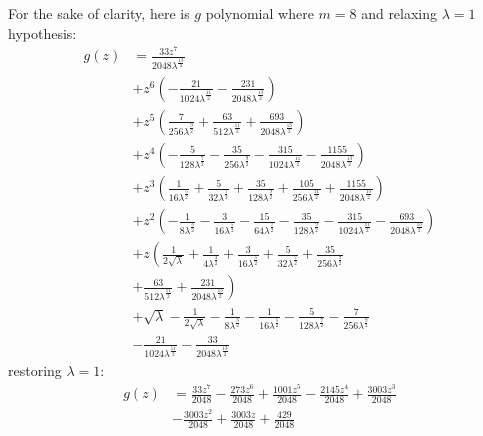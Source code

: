 For the sake of clarity, here is $g$ polynomial where $m=8$ and relaxing $\lambda=1$ hypothesis:
\begin{displaymath}
\begin{split}
g{\left (z \right )} &= \frac{33 z^{7}}{2048 \lambda^{\frac{13}{2}}} \\
&+ z^{6} \left(- \frac{21}{1024 \lambda^{\frac{11}{2}}} - \frac{231}{2048 \lambda^{\frac{13}{2}}}\right) \\
&+ z^{5} \left(\frac{7}{256 \lambda^{\frac{9}{2}}} + \frac{63}{512 \lambda^{\frac{11}{2}}} + \frac{693}{2048 \lambda^{\frac{13}{2}}}\right) \\
&+ z^{4} \left(- \frac{5}{128 \lambda^{\frac{7}{2}}} - \frac{35}{256 \lambda^{\frac{9}{2}}} - \frac{315}{1024 \lambda^{\frac{11}{2}}} - \frac{1155}{2048 \lambda^{\frac{13}{2}}}\right) \\
&+ z^{3} \left(\frac{1}{16 \lambda^{\frac{5}{2}}} + \frac{5}{32 \lambda^{\frac{7}{2}}} + \frac{35}{128 \lambda^{\frac{9}{2}}} + \frac{105}{256 \lambda^{\frac{11}{2}}} + \frac{1155}{2048 \lambda^{\frac{13}{2}}}\right) \\
&+ z^{2} \left(- \frac{1}{8 \lambda^{\frac{3}{2}}} - \frac{3}{16 \lambda^{\frac{5}{2}}} - \frac{15}{64 \lambda^{\frac{7}{2}}} - \frac{35}{128 \lambda^{\frac{9}{2}}} - \frac{315}{1024 \lambda^{\frac{11}{2}}} - \frac{693}{2048 \lambda^{\frac{13}{2}}}\right) \\
&+ z \left(\frac{1}{2 \sqrt{\lambda}} + \frac{1}{4 \lambda^{\frac{3}{2}}} + \frac{3}{16 \lambda^{\frac{5}{2}}} + \frac{5}{32 \lambda^{\frac{7}{2}}} + \frac{35}{256 \lambda^{\frac{9}{2}}} \right. \\
    &+ \left. \frac{63}{512 \lambda^{\frac{11}{2}}} + \frac{231}{2048 \lambda^{\frac{13}{2}}}\right) \\
&+ \sqrt{\lambda} - \frac{1}{2 \sqrt{\lambda}} - \frac{1}{8 \lambda^{\frac{3}{2}}} - \frac{1}{16 \lambda^{\frac{5}{2}}} - \frac{5}{128 \lambda^{\frac{7}{2}}} - \frac{7}{256 \lambda^{\frac{9}{2}}} \\
&- \frac{21}{1024 \lambda^{\frac{11}{2}}} - \frac{33}{2048 \lambda^{\frac{13}{2}}}
\end{split}
\end{displaymath}
restoring $\lambda=1$:
\begin{displaymath}
\begin{split}
g{\left (z \right )} &= \frac{33 z^{7}}{2048} - \frac{273 z^{6}}{2048} + \frac{1001 z^{5}}{2048} - \frac{2145 z^{4}}{2048} + \frac{3003 z^{3}}{2048} \\
&- \frac{3003 z^{2}}{2048} + \frac{3003 z}{2048} + \frac{429}{2048}
\end{split}
\end{displaymath}


